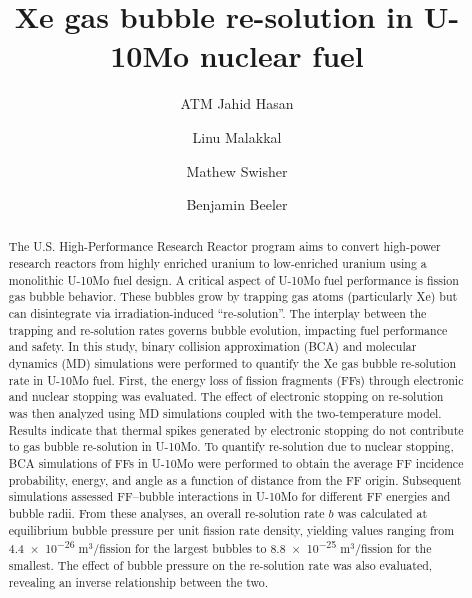 \documentclass[review]{elsarticle}
\begin{document}
\begin{frontmatter}

\title{Xe gas bubble re-solution in U-10Mo nuclear fuel}

\author[ncsu]{ATM Jahid Hasan}
\author[inl]{Linu Malakkal}
\author[inl]{Mathew Swisher}
\author[ncsu,inl]{Benjamin Beeler}

\address[ncsu]{Department of Nuclear Engineering, North Carolina State
University, Raleigh, NC 27695, United States}
\address[inl]{Idaho National Laboratory, Idaho Falls, ID 83415, United States}

\begin{abstract}
	The U.S. High-Performance Research Reactor program aims to convert high-power research reactors from highly enriched uranium to low-enriched uranium using a monolithic U-10Mo fuel design. A critical aspect of U-10Mo fuel performance is fission gas bubble behavior. These bubbles grow by trapping gas atoms (particularly Xe) but can disintegrate via irradiation-induced ``re-solution''. The interplay between the trapping and re-solution rates governs bubble evolution, impacting fuel performance and safety. In this study, binary collision approximation (BCA) and molecular dynamics (MD) simulations were performed to quantify the Xe gas bubble re-solution rate in U-10Mo fuel. First, the energy loss of fission fragments (FFs) through electronic and nuclear stopping was evaluated. The effect of electronic stopping on re-solution was then analyzed using MD simulations coupled with the two-temperature model. Results indicate that thermal spikes generated by electronic stopping do not contribute to gas bubble re-solution in U-10Mo. To quantify re-solution due to nuclear stopping, BCA simulations of FFs in U-10Mo were performed to obtain the average FF incidence probability, energy, and angle as a function of distance from the FF origin. Subsequent simulations assessed FF--bubble interactions in U-10Mo for different FF energies and bubble radii. From these analyses, an overall re-solution rate $b$ was calculated at equilibrium bubble pressure per unit fission rate density, yielding values ranging from \num{4.4e-26} m$^3$/fission for the largest bubbles to \num{8.8e-25} m$^3$/fission for the smallest. The effect of bubble pressure on the re-solution rate was also evaluated, revealing an inverse relationship between the two.
\end{abstract}

\end{frontmatter}

\linenumbers
\end{document}
